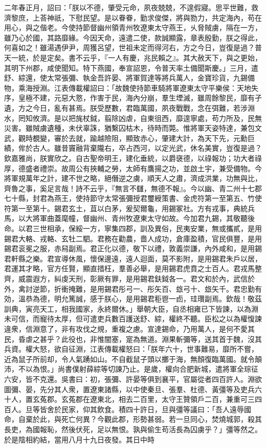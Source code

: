 \begin{pinyinscope}
二年春正月，詔曰：「朕以不德，肇受元命，夙夜兢兢，不遑假寢。思平世難，救濟黎庶，上荅神祇，下慰民望。是以眷眷，勤求俊傑，將與勠力，共定海內，苟在用心，與之偕老。今使持節督幽州領青州牧遼東太守燕王，乆脅賊虜，隔在一方，雖乃心於國，其路靡緣。今因天命，遠遣二使，款誠顯露，章表殷勤，朕之得此，何喜如之！雖湯遇伊尹，周獲呂望，世祖未定而得河右，方之今日，豈復是過？普天一統，於是定矣。書不云乎，『一人有慶，兆民賴之』。其大赦天下，與之更始，其明下州郡，咸使聞知。特下燕國，奉宣詔恩，令普天率土備聞斯慶。」三月，遣舒、綜還，使太常張彌、執金吾許晏、將軍賀達等將兵萬人，金寶珍貨，九錫備物，乘海授淵。江表傳載權詔曰：「故魏使持節車騎將軍遼東太守平樂侯：天地失序，皇極不建，元惡大憝，作害于民，海內分崩，羣生堙滅，雖周餘黎民，靡有孑遺，方之今日，亂有甚焉。朕受歷數，君臨萬國，夙夜戰戰，念在弭難，若涉淵水，罔知攸濟。是以把旄杖鉞，翦除凶虐，自東徂西，靡遑寧處，苟力所及，民無災害。雖賊虜遺種，未伏辜誅，猶繫囚枯木，待時而斃。惟將軍天姿特達，兼包文武，觀時覩變，審於去就，踰越險阻，顯致赤心，肇建大計，為天下先，元勳巨績，侔於古人。雖昔竇融背棄隴右，卒占西河，以定光武，休名美實，豈復是過？欽嘉雅尚，朕實欣之。自古聖帝明王，建化垂統，以爵襃德，以祿報功；功大者祿厚，德盛者禮崇。故周公有挾輔之勞，太師有鷹揚之功，並啟土宇，兼受備物。今將軍規萬年之計，建不世之略，絕僭逆之虜，順天人之肅，濟成洪業，功無與比，齊魯之事，奚足言哉！詩不云乎，『無言不讎，無德不報』。今以幽、青二州十七郡七十縣，封君為燕王，使持節守太常張彌授君璽綬策書、金虎符第一至第五、竹使符第一至第十。錫君玄土，苴以白茅，爰契爾龜，用錫冢社。方有戎事，典統兵馬，以大將軍曲蓋麾幢，督幽州、青州牧遼東太守如故。今加君九錫，其敬聽後命。以君三世相承，保綏一方，寧集四郡，訓及異俗，民夷安業，無或攜貳，是用錫君大輅、戎輅、玄牡二駟。君務在勸農，嗇人成功，倉庫盈積，官民俱豐，是用錫君衮冕之服，赤舄副焉。君正化以德，敬下以禮，敦義崇謙，內外咸和，是用錫君軒縣之樂。君宣導休風，懷保邊遠，遠人迴面，莫不影附，是用錫君朱戶以居，君運其才略，官方任賢，顯直措枉，羣善必舉，是用錫君虎賁之士百人。君戎馬整齊，威震遐方，糾虔天刑，彰厥有罪，是用錫君鈇鉞各一。君文和於內，武信於外，禽討逆節，折衝掩難，是用錫君彤弓一、彤矢百、玈弓十、玈矢千。君忠勤有効，溫恭為德，明允篤誠，感于朕心，是用錫君秬鬯一卣，珪瓚副焉。欽哉！敬茲訓典，寅亮天工，相我國家，永終爾休。」舉朝大臣，自丞相雍已下皆諫，以為淵未可信，而寵待太厚，但可遣吏兵數百護送舒、綜，權終不聽。臣松之以為權愎諫違衆，信淵意了，非有攻伐之規，重複之慮。宣達錫命，乃用萬人，是何不愛其民，昏虐之甚乎？此役也，非惟闇塞，寔為無道。淵果斬彌等，送其首于魏，沒其兵資。權大怒，欲自征淵，江表傳載權怒曰：「朕年六十，世事難易，靡所不嘗，近為鼠子所前却，令人氣踴如山。不自截鼠子頭以擲于海，無顏復臨萬國。就令顛沛，不以為恨。」尚書僕射薛綜等切諫乃止。是歲，權向合肥新城，遣將軍全琮征六安，皆不克還。吳書曰：初，張彌、許晏等俱到襄平，官屬從者四百許人。淵欲圖彌、晏，先分其人衆，置遼東諸縣，以中使秦旦、張羣、杜德、黃彊等及吏兵六十人，置玄菟郡。玄菟郡在遼東北，相去二百里，太守王贊領戶二百，兼重可三四百人。旦等皆舍於民家，仰其飲食。積四十許日，旦與彊等議曰：「吾人遠辱國命，自棄於此，與死亡何異？今觀此郡，形勢甚弱。若一旦同心，焚燒城郭，殺其長吏，為國報恥，然後伏死，足以無恨。孰與偷生苟活長為囚虜乎？」彊等然之。於是陰相約結，當用八月十九日夜發。其日中時
\end{pinyinscope}

